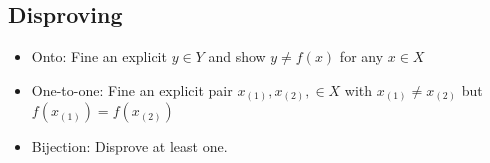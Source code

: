 \documentclass[a4paper, 11pt]{report}
\begin{document}
    \subsection{Disproving}
    \begin{itemize}
        \item Onto: Fine an explicit \(y \in Y\) and show \(y \neq f(x)\) for any \(x \in X\)
        \item One-to-one: Fine an explicit pair \(x_(1), x_(2), \in X\) with \(x_(1) \neq x_(2)\) but \(f(x_(1)) = f(x_(2))\)
        \item Bijection: Disprove at least one.
    \end{itemize}
\end{document}

